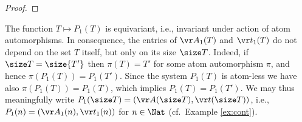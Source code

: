 \begin{proof}
%
%
\end{proof}
%
The function $T\mapsto P_1(T)$ is equivariant, i.e., invariant under action of atom automorphisms.
In consequence, the entries of $\vr A_1(T)$ and $\vr t_1(T)$ do not depend on the set $T$ itself, but only
on its size $\size T$. 
Indeed, if $\size T = \size{T'}$ then $\pi(T) = T'$ for some atom automorphism $\pi$, and hence
$\pi(P_1(T)) = P_1(T')$.
Since the system $P_1(T)$ is atom-less 
we have also $\pi(P_1(T)) = P_1(T)$,
which implies 
$ P_1(T) = P_1(T'). $
We may thus meaningfully write $P_1(\size T) = (\vr A(\size T), \vr t(\size T))$, i.e.,
$P_1(n) = (\vr A_1(n), \vr t_1(n))$ for $n\in\Nat$
 (cf.~Example \ref{ex:cont}).
%



